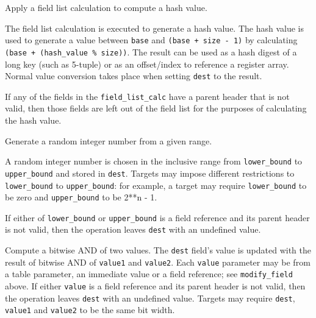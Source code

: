 \documentclass[12pt]{article}
\begin{document}

{ %
{Apply a field list calculation to compute a hash value.}
}
{ %
}
{ %
The field list calculation is executed to generate a hash value.
The hash value is used to generate a value between \texttt{base} and
\texttt{(base + size - 1)} by calculating \texttt{(base + (hash_value \% size))}.
The result can be used as a hash digest of a long key (such as 5-tuple) or as
an offset/index to reference a register array. Normal value conversion
takes place when setting \texttt{dest} to the result.

If any of the fields in the \texttt{field_list_calc} have a parent
header that is not valid, then those fields are left out of the field list for the purposes of calculating the hash value.
}


{ %
Generate a random integer number from a given range.
}
{ %
}
{ %
A random integer number is chosen in the inclusive range from \texttt{lower_bound} to \texttt{upper_bound}
and stored in \texttt{dest}.
Targets may impose different restrictions to \texttt{lower_bound} to \texttt{upper_bound}:
for example, a target may require \texttt{lower_bound}
to be zero and \texttt{upper_bound} to be 2**n - 1.

If either of \texttt{lower_bound} or \texttt{upper_bound} is a field reference
and its parent header is not valid, then the operation leaves
\texttt{dest} with an undefined value.
}


{ %
Compute a bitwise AND of two values.
}
{ %
}
{ %
The \texttt{dest} field's value is updated with the result of bitwise AND of
\texttt{value1} and \texttt{value2}. Each \texttt{value} parameter may be from a
table parameter, an immediate value or a field reference; see \texttt{modify_field} above. If either \texttt{value}
is a field reference and its parent header is not valid, then the operation
leaves \texttt{dest} with an undefined value.
Targets may require \texttt{dest}, \texttt{value1} and \texttt{value2} to
be the same bit width.
}
\end{document}
